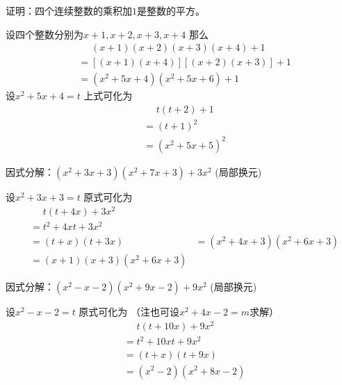 \documentclass[windows,csize4,answers]{BHCexam}
\begin{document}
\begin{groups}
\begin{questions}[]
        \question[5] 证明：四个连续整数的乘积加$1$是整数的平方。
        \begin{solution}{0.5cm}
            \methodonly 设四个整数分别为$x+1,x+2,x+3,x+4$ 那么
            \[
                \begin{aligned}
                     & \phantom{=}(x+1)(x+2)(x+3)(x+4)+1 \\
                     & = [(x+1)(x+4)][(x+2)(x+3)]+1      \\
                     & = (x^2+5x+4)(x^2+5x+6) +1
                \end{aligned}
            \]
            设$x^2+5x+4=t$ 上式可化为
            \[
                \begin{aligned}
                     & \phantom{=}t(t+2)+1 \\
                     & = (t+1)^2           \\
                     & = (x^2+5x+5)^2
                \end{aligned}
            \]
        \end{solution}
        \vspace{3.5cm}

        \question[5] 因式分解：$(x^2+3x+3)(x^2+7x+3)+3x^2$ (局部换元)
        \begin{solution}{0.5cm}
            \methodonly 设$x^2+3x+3=t$ 原式可化为
            \[
                \begin{aligned}
                     & \phantom{=}t(t+4x)+3x^2 \\
                     & = t^2+4xt+3x^2 \\ 
                     & = (t+x)(t+3x)
                     & = (x^2+4x+3)(x^2+6x+3) \\ 
                     & = (x+1)(x+3)(x^2+6x+3)
                \end{aligned}
            \]
        \end{solution}
        \vspace{3.5cm}

        \question[5] 因式分解：$(x^2-x-2)(x^2+9x-2)+9x^2$ (局部换元)
        \begin{solution}{0.5cm}
            \methodonly 设$x^2-x-2=t$ 原式可化为 （注也可设$x^2+4x-2=m$求解）
            \[
                \begin{aligned}
                     & \phantom{=}t(t+10x)+9x^2 \\
                     & = t^2+10xt+9x^2 \\ 
                     & = (t+x)(t+9x) \\ 
                     & = (x^2-2)(x^2+8x-2)
                \end{aligned}
            \]
        \end{solution}
        \vspace{3.5cm}


\end{questions}
\end{groups}
\end{document}
